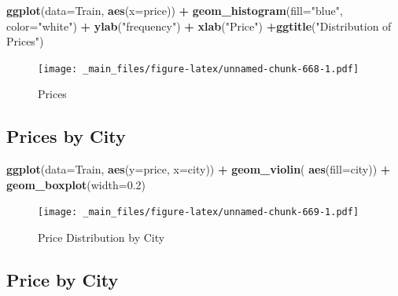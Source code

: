 \documentclass[]{book}
\newenvironment{Shaded}{\begin{snugshade}}{\end{snugshade}}
\newcommand{\KeywordTok}[1]{\textcolor[rgb]{0.13,0.29,0.53}{\textbf{#1}}}
\newcommand{\DataTypeTok}[1]{\textcolor[rgb]{0.13,0.29,0.53}{#1}}
\newcommand{\FloatTok}[1]{\textcolor[rgb]{0.00,0.00,0.81}{#1}}
\newcommand{\StringTok}[1]{\textcolor[rgb]{0.31,0.60,0.02}{#1}}
\newcommand{\OperatorTok}[1]{\textcolor[rgb]{0.81,0.36,0.00}{\textbf{#1}}}
\newcommand{\NormalTok}[1]{#1}
\begin{document}
\begin{Shaded}
\begin{Highlighting}[]
\KeywordTok{ggplot}\NormalTok{(}\DataTypeTok{data=}\NormalTok{Train, }\KeywordTok{aes}\NormalTok{(}\DataTypeTok{x=}\NormalTok{price)) }\OperatorTok{+}\StringTok{ }\KeywordTok{geom_histogram}\NormalTok{(}\DataTypeTok{fill=}\StringTok{"blue"}\NormalTok{, }\DataTypeTok{color=}\StringTok{"white"}\NormalTok{) }\OperatorTok{+}\StringTok{ }
\StringTok{  }\KeywordTok{ylab}\NormalTok{(}\StringTok{"frequency"}\NormalTok{) }\OperatorTok{+}\StringTok{ }\KeywordTok{xlab}\NormalTok{(}\StringTok{"Price"}\NormalTok{) }\OperatorTok{+}\KeywordTok{ggtitle}\NormalTok{(}\StringTok{"Distribution of Prices"}\NormalTok{)}
\end{Highlighting}
\end{Shaded}

\begin{figure}
\centering
\texttt{[image: \_main\_files/figure-latex/unnamed-chunk-668-1.pdf]}
\caption{\label{fig:unnamed-chunk-668}Prices}
\end{figure}

\subsection{Prices by City}\label{prices-by-city}

\begin{Shaded}
\begin{Highlighting}[]
\KeywordTok{ggplot}\NormalTok{(}\DataTypeTok{data=}\NormalTok{Train, }\KeywordTok{aes}\NormalTok{(}\DataTypeTok{y=}\NormalTok{price, }\DataTypeTok{x=}\NormalTok{city)) }\OperatorTok{+}\StringTok{ }\KeywordTok{geom_violin}\NormalTok{( }\KeywordTok{aes}\NormalTok{(}\DataTypeTok{fill=}\NormalTok{city)) }\OperatorTok{+}\StringTok{ }\KeywordTok{geom_boxplot}\NormalTok{(}\DataTypeTok{width=}\FloatTok{0.2}\NormalTok{)}
\end{Highlighting}
\end{Shaded}

\begin{figure}
\centering
\texttt{[image: \_main\_files/figure-latex/unnamed-chunk-669-1.pdf]}
\caption{\label{fig:unnamed-chunk-669}Price Distribution by City}
\end{figure}

\subsection{Price by City}\label{price-by-city}
\end{document}
